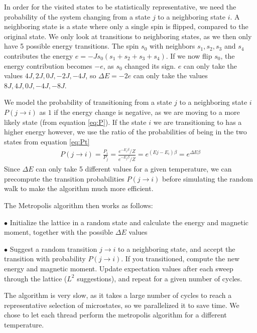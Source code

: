 \documentclass[reprint,english,notitlepage]{revtex4-1}
\begin{document}
	In order for the visited states to be statistically representative, we need the probability of the system changing from a state $j$ to a neighboring state $i$. A neighboring state is a state where only a single spin is flipped, compared to the original state. We only look at transitions to neighboring states, as we then only have 5 possible energy transitions. The spin $s_0$ with neighbors $s_1, s_2, s_3$ and $s_4$ contributes the energy $e = -J s_0(s_1 + s_2 + s_3 + s_4)$. If we now flip $s_0$, the energy contribution becomes $-e$, as $s_0$ changed its sign. $e$ can only take the values $4J, 2J, 0J, -2J, -4J$, so $\Delta E = -2e$ can only take the values $8J, 4J, 0J, -4J, -8J$.
	
	We model the probability of transitioning from a state $j$ to a neighboring state $i$ $P(j \rightarrow i)$ as $1$ if the energy change is negative, as we are moving to a more likely state (from equation \ref{eq:P}). If the state $i$ we are transitioning to has a higher energy however, we use the ratio of the probabilities of being in the two states from equation \ref{eq:Pt}
	\begin{equation*}
	\begin{aligned}
	P(j \rightarrow i) = \frac{P_i}{P_j} = \frac{e^{-E_i \beta}/Z}{e^{-E_j \beta}/Z} = e^{(Ej - E_i) \beta} = e^{\Delta E \beta}
	\end{aligned}
	\end{equation*}
	Since $\Delta E$ can only take 5 different values for a given temperature, we can precompute the transition probabilities $P(j \rightarrow i)$ before simulating the random walk to make the algorithm much more efficient.
	
	The Metropolis algorithm then works as follows:
	
	$\bullet$ Initialize the lattice in a random state and calculate the energy and magnetic moment, together with the possible $\Delta E$ values
	
	$\bullet$ Suggest a random transition $j \rightarrow i$ to a neighboring state, and accept the transition with probability $P(j \rightarrow i)$. If you transitioned, compute the new energy and magnetic moment. Update expectation values after each sweep through the lattice ($L^2$ suggestions), and repeat for a given number of cycles.
	
	The algorithm is very slow, as it takes a large number of cycles to reach a representative selection of microstates, so we parallelized it to save time. We chose to let each thread perform the metropolis algorithm for a different temperature.
	
\end{document}
